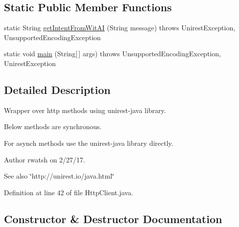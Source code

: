 \subsection*{Static Public Member Functions}
\begin{DoxyCompactItemize}
\item 
static String \hyperlink{classedu_1_1sjsu_1_1amigo_1_1http_1_1client_1_1_http_client_ae5e31be5a3496bb9fa4b2c19c9835f4c}{get\+Intent\+From\+Wit\+AI} (String message)  throws Unirest\+Exception, Unsupported\+Encoding\+Exception 
\item 
static void \hyperlink{classedu_1_1sjsu_1_1amigo_1_1http_1_1client_1_1_http_client_acbee11c47575acbc6604fb1b0e2fd4c5}{main} (String\mbox{[}$\,$\mbox{]} args)  throws Unsupported\+Encoding\+Exception, Unirest\+Exception 
\end{DoxyCompactItemize}


\subsection{Detailed Description}
Wrapper over http methods using unirest-\/java library.

Below methods are synchronous.

For asynch methods use the unirest-\/java library directly.

\begin{DoxyAuthor}{Author}
rwatsh on 2/27/17. 
\end{DoxyAuthor}
\begin{DoxySeeAlso}{See also}
\char`\"{}http\+://unirest.\+io/java.\+html\char`\"{} 
\end{DoxySeeAlso}


Definition at line 42 of file Http\+Client.\+java.



\subsection{Constructor \& Destructor Documentation}
\mbox{\label{classedu_1_1sjsu_1_1amigo_1_1http_1_1client_1_1_http_client_a31a5f027d0d0e24715652481b4de3b5c}} 
